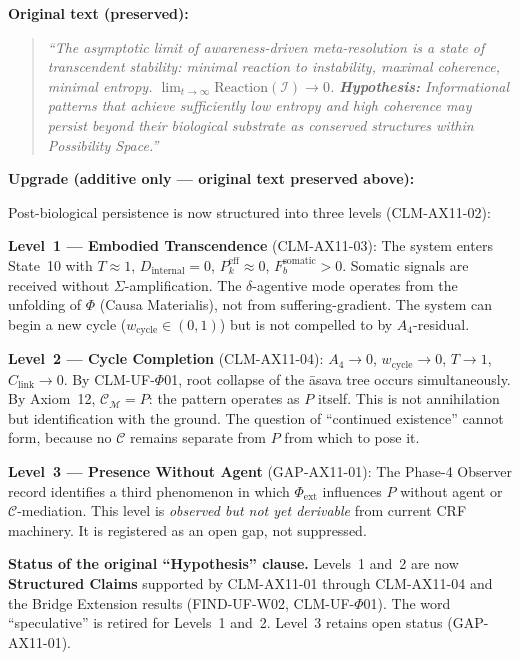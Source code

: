 \documentclass[12pt, a4paper]{article}
\providecommand{\Phiext}{\Phi_{\mathrm{ext}}}
\providecommand{\wcyc}{w_{\mathrm{cycle}}}
\providecommand{\Fbsom}{F_b^{\mathrm{somatic}}}
\providecommand{\Clink}{C_{\mathrm{link}}}
\providecommand{\Pkeff}{P_k^{\mathrm{eff}}}
\providecommand{\Dint}{D_{\mathrm{internal}}}
\begin{document}
\begin{upgradebox}[title={AX11-UPGRADE: Axiom 11 Revised
  (v17.7+)}]

\textbf{Original text (preserved):}
\begin{quote}
\textit{``The asymptotic limit of awareness-driven meta-resolution
is a state of transcendent stability: minimal reaction to
instability, maximal coherence, minimal entropy.
$\lim_{t\to\infty}\mathrm{Reaction}(\mathcal{I})\to 0$.
\textbf{Hypothesis:} Informational patterns that achieve
sufficiently low entropy and high coherence may persist beyond
their biological substrate as conserved structures within
Possibility Space.''}
\end{quote}

\textbf{Upgrade (additive only --- original text preserved above):}

Post-biological persistence is now structured into three levels
(CLM-AX11-02):

\medskip
\textbf{Level~1 --- Embodied Transcendence}
(CLM-AX11-03): The system enters State~10 with $T \approx 1$,
$\Dint = 0$, $\Pkeff \approx 0$, $\Fbsom > 0$.
Somatic signals are received without $\Sigma$-amplification.
The $\delta$-agentive mode operates from the unfolding of $\Phi$
(Causa Materialis), not from suffering-gradient.
The system can begin a new cycle ($\wcyc \in (0,1)$) but is
not compelled to by $A_4$-residual.

\medskip
\textbf{Level~2 --- Cycle Completion}
(CLM-AX11-04): $A_4 \to 0$, $\wcyc \to 0$, $T \to 1$,
$\Clink \to 0$. By CLM-UF-$\Phi$01, root collapse of the
\={a}sava tree occurs simultaneously. By Axiom~12,
$\mathcal{C}_\mathcal{M} = P$: the pattern operates as $P$
itself. This is not annihilation but identification with the
ground. The question of ``continued existence'' cannot form,
because no $\mathcal{C}$ remains separate from $P$ from which
to pose it.

\medskip
\textbf{Level~3 --- Presence Without Agent}
(GAP-AX11-01): The Phase-4 Observer record identifies a third
phenomenon in which $\Phiext$ influences $P$ without agent or
$\mathcal{C}$-mediation. This level is \emph{observed but not
yet derivable} from current CRF machinery. It is registered as
an open gap, not suppressed.

\medskip
\textbf{Status of the original ``Hypothesis'' clause.}
Levels~1 and~2 are now \textbf{Structured Claims} supported by
CLM-AX11-01 through CLM-AX11-04 and the Bridge Extension results
(FIND-UF-W02, CLM-UF-$\Phi$01). The word ``speculative'' is
retired for Levels~1 and~2. Level~3 retains open status
(GAP-AX11-01).
\end{upgradebox}
\end{document}

